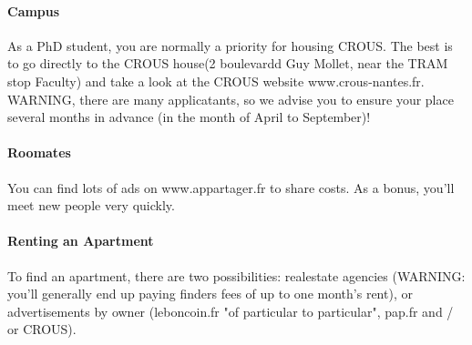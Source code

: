 \paragraph{Campus}
As a PhD student, you are normally a priority for housing CROUS.
The best is to go directly to the CROUS house(2 boulevardd Guy Mollet, near the TRAM stop Faculty) and take a look at the CROUS website www.crous-nantes.fr.
WARNING, there are many applicatants, so we advise you to ensure your place several months in advance (in the month of April to September)!


\paragraph{Roomates}
You can find lots of ads on www.appartager.fr to share costs. As a bonus, you'll meet new people very quickly.


\paragraph{Renting an Apartment}
To find an apartment, there are two possibilities: realestate agencies (WARNING: you'll generally end up paying finders fees of up to one month's rent), or advertisements by owner (leboncoin.fr "of particular to particular", pap.fr and / or CROUS).


